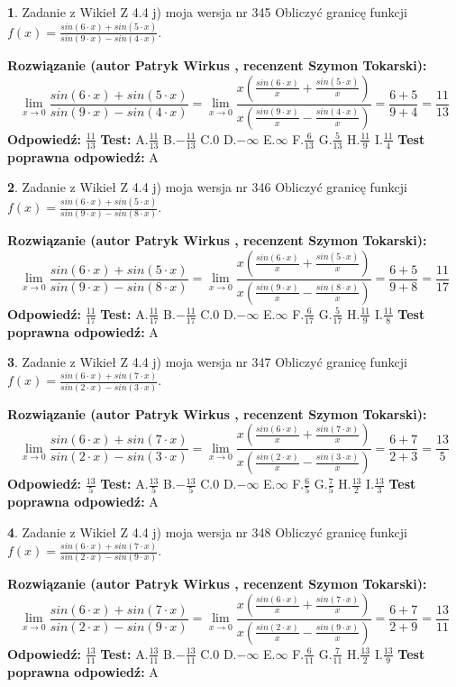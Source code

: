 \documentclass[12pt, a4paper]{article}
\theoremstyle{definition} %
\newtheorem{zad}{}
\newcommand{\zadStart}[1]{\begin{zad}#1\newline}
\newcommand{\zadStop}{\end{zad}}
\newcommand{\rozwStart}[2]{\noindent \textbf{Rozwiązanie (autor #1 , recenzent #2): }\newline}
\newcommand{\rozwStop}{\newline}
\newcommand{\odpStart}{\noindent \textbf{Odpowiedź:}\newline}
\newcommand{\odpStop}{\newline}
\newcommand{\testStart}{\noindent \textbf{Test:}\newline}
\newcommand{\testStop}{\newline}
\newcommand{\kluczStart}{\noindent \textbf{Test poprawna odpowiedź:}\newline}
\newcommand{\kluczStop}{\newline}
\begin{document}
\zadStart{Zadanie z Wikieł Z 4.4 j) moja wersja nr 345}
Obliczyć granicę funkcji $f(x)=\frac{sin(6\cdot x) +sin(5\cdot x)}{sin(9\cdot x) -sin(4\cdot x)}$.
\zadStop
\rozwStart{Patryk Wirkus}{Szymon Tokarski}
$$\lim\limits_{x\to 0}\frac{sin(6\cdot x) +sin(5\cdot x)}{sin(9\cdot x) -sin(4\cdot x)}=\lim\limits_{x\to 0}\frac{x(\frac{sin(6\cdot x)}{x}+\frac{sin(5\cdot x)}{x})}{x(\frac{sin(9\cdot x)}{x}-\frac{sin(4\cdot x)}{x})}=\frac{6+5}{9+4} = \frac{11}{13}$$
\rozwStop
\odpStart
$\frac{11}{13}$
\odpStop
\testStart
A.$\frac{11}{13}$
B.$-\frac{11}{13}$
C.$0$
D.$-\infty$
E.$\infty$
F.$\frac{6}{13}$
G.$\frac{5}{13}$
H.$\frac{11}{9}$
I.$\frac{11}{4}$
\testStop
\kluczStart
A
\kluczStop



\zadStart{Zadanie z Wikieł Z 4.4 j) moja wersja nr 346}
Obliczyć granicę funkcji $f(x)=\frac{sin(6\cdot x) +sin(5\cdot x)}{sin(9\cdot x) -sin(8\cdot x)}$.
\zadStop
\rozwStart{Patryk Wirkus}{Szymon Tokarski}
$$\lim\limits_{x\to 0}\frac{sin(6\cdot x) +sin(5\cdot x)}{sin(9\cdot x) -sin(8\cdot x)}=\lim\limits_{x\to 0}\frac{x(\frac{sin(6\cdot x)}{x}+\frac{sin(5\cdot x)}{x})}{x(\frac{sin(9\cdot x)}{x}-\frac{sin(8\cdot x)}{x})}=\frac{6+5}{9+8} = \frac{11}{17}$$
\rozwStop
\odpStart
$\frac{11}{17}$
\odpStop
\testStart
A.$\frac{11}{17}$
B.$-\frac{11}{17}$
C.$0$
D.$-\infty$
E.$\infty$
F.$\frac{6}{17}$
G.$\frac{5}{17}$
H.$\frac{11}{9}$
I.$\frac{11}{8}$
\testStop
\kluczStart
A
\kluczStop



\zadStart{Zadanie z Wikieł Z 4.4 j) moja wersja nr 347}
Obliczyć granicę funkcji $f(x)=\frac{sin(6\cdot x) +sin(7\cdot x)}{sin(2\cdot x) -sin(3\cdot x)}$.
\zadStop
\rozwStart{Patryk Wirkus}{Szymon Tokarski}
$$\lim\limits_{x\to 0}\frac{sin(6\cdot x) +sin(7\cdot x)}{sin(2\cdot x) -sin(3\cdot x)}=\lim\limits_{x\to 0}\frac{x(\frac{sin(6\cdot x)}{x}+\frac{sin(7\cdot x)}{x})}{x(\frac{sin(2\cdot x)}{x}-\frac{sin(3\cdot x)}{x})}=\frac{6+7}{2+3} = \frac{13}{5}$$
\rozwStop
\odpStart
$\frac{13}{5}$
\odpStop
\testStart
A.$\frac{13}{5}$
B.$-\frac{13}{5}$
C.$0$
D.$-\infty$
E.$\infty$
F.$\frac{6}{5}$
G.$\frac{7}{5}$
H.$\frac{13}{2}$
I.$\frac{13}{3}$
\testStop
\kluczStart
A
\kluczStop



\zadStart{Zadanie z Wikieł Z 4.4 j) moja wersja nr 348}
Obliczyć granicę funkcji $f(x)=\frac{sin(6\cdot x) +sin(7\cdot x)}{sin(2\cdot x) -sin(9\cdot x)}$.
\zadStop
\rozwStart{Patryk Wirkus}{Szymon Tokarski}
$$\lim\limits_{x\to 0}\frac{sin(6\cdot x) +sin(7\cdot x)}{sin(2\cdot x) -sin(9\cdot x)}=\lim\limits_{x\to 0}\frac{x(\frac{sin(6\cdot x)}{x}+\frac{sin(7\cdot x)}{x})}{x(\frac{sin(2\cdot x)}{x}-\frac{sin(9\cdot x)}{x})}=\frac{6+7}{2+9} = \frac{13}{11}$$
\rozwStop
\odpStart
$\frac{13}{11}$
\odpStop
\testStart
A.$\frac{13}{11}$
B.$-\frac{13}{11}$
C.$0$
D.$-\infty$
E.$\infty$
F.$\frac{6}{11}$
G.$\frac{7}{11}$
H.$\frac{13}{2}$
I.$\frac{13}{9}$
\testStop
\kluczStart
A
\kluczStop
\end{document}
